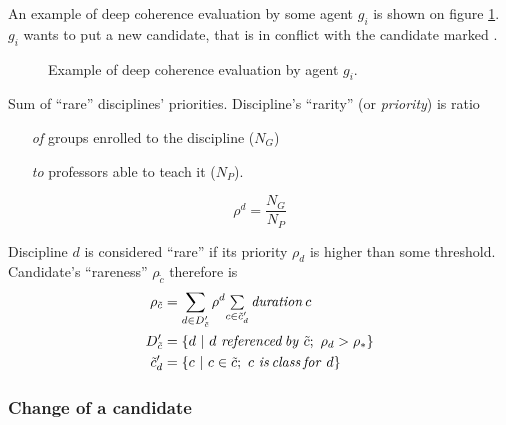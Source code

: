\documentclass[../../ThesisDoc]{subfiles}
\begin{document}
\medskip

\noindent
An example of deep coherence evaluation by some agent $g_i$ is shown on figure
\ref{fig:ConflictDeepCoherence}. $g_i$ wants to put a new candidate, that is
in conflict with the candidate marked .



\begin{figure}[H]
  \centering
  \resizebox{\textwidth}{!}{
    
    }
  \caption{Example of deep coherence evaluation by agent $g_i$.}
  \label{fig:ConflictDeepCoherence}
\end{figure}



Sum of ``rare'' disciplines' priorities. Discipline's ``rarity'' (or
\emph{priority}) is ratio
\begin{itemize}
  \item[\textit{of}] groups enrolled to the discipline ($N_G$)
  \item[\textit{to}] professors able to teach it ($N_P$).
\end{itemize}

$$\rho^d = \dfrac{N_G}{N_P}$$

\medskip
\noindent
Discipline $d$ is considered ``rare'' if its priority $\rho_d$ is higher than
some threshold. \\
\noindent
Candidate's ``rareness'' $\rho_{\tilde{c}}$ therefore is
\begin{align*}
  \rho_{\tilde{c}} &= \sum\limits_{d \in D'_{\tilde{c}}}
        \rho^d \mathsmaller{ \sum\limits_{c \in \tilde{c}'_d}
                              \mathit{duration}\, c }\\
  D'_{\tilde{c}} &= \lbrace d ~|~ d ~\mathit{referenced\,by}~ \tilde{c};~
                                \rho_d > \rho_* \rbrace\\
  \tilde{c}'_d &= \lbrace c ~|~ c \in \tilde{c};~ c ~\mathit{is\,class\,for}~ d \rbrace
\end{align*}


\subsubsection{Change of a candidate}
\label{sec:solution-change}
\end{document}
